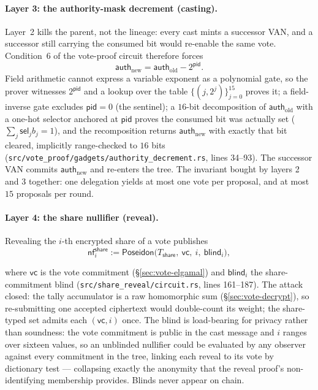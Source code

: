 \documentclass[11pt,a4paper]{article}
\theoremstyle{definition}
\newcommand{\nfsym}{\mathsf{nf}}
\begin{document}
\paragraph{Layer 3: the authority-mask decrement (casting).} Layer~2 kills
the parent, not the lineage: every cast mints a successor VAN, and a
successor still carrying the consumed bit would re-enable the same vote.
Condition~6 of the vote-proof circuit therefore forces
\[
\mathsf{auth}_{\mathrm{new}} = \mathsf{auth}_{\mathrm{old}} -
2^{\mathsf{pid}}.
\]
Field arithmetic cannot express a variable exponent as a polynomial gate, so
the prover witnesses $2^{\mathsf{pid}}$ and a lookup over the table
$\{(j, 2^{j})\}_{j=0}^{15}$ proves it; a field-inverse gate excludes
$\mathsf{pid} = 0$ (the sentinel); a $16$-bit decomposition of
$\mathsf{auth}_{\mathrm{old}}$ with a one-hot selector anchored at
$\mathsf{pid}$ proves the consumed bit was actually set ($\sum_j
\mathsf{sel}_j b_j = 1$), and the recomposition returns
$\mathsf{auth}_{\mathrm{new}}$ with exactly that bit cleared, implicitly
range-checked to $16$ bits
(\texttt{src/vote\_proof/gadgets/authority\_decrement.rs}, lines 34--93).
The successor VAN commits $\mathsf{auth}_{\mathrm{new}}$ and re-enters the
tree. The invariant bought by layers 2 and 3 together: one delegation yields
at most one vote per proposal, and at most $15$ proposals per round.

\paragraph{Layer 4: the share nullifier (reveal).} Revealing the $i$-th
encrypted share of a vote publishes
\[
\nfsym^{\mathsf{share}}_{i} := \mathsf{Poseidon}\bigl(T_{\mathsf{share}},\
\mathsf{vc},\ i,\ \mathsf{blind}_i\bigr),
\]
\begin{sloppypar}
where $\mathsf{vc}$ is the vote commitment (\S\ref{sec:vote-elgamal}) and
$\mathsf{blind}_i$ the share-commitment blind
(\texttt{src/share\_reveal/circuit.rs}, lines 161--187). The attack closed:
the tally accumulator is a raw homomorphic sum
(\S\ref{sec:vote-decrypt}), so re-submitting one accepted ciphertext would
double-count its weight; the share-typed set admits each
$(\mathsf{vc}, i)$ once. The blind is load-bearing for privacy rather than
soundness: the vote commitment is public in the cast message and $i$ ranges
over sixteen values, so an unblinded nullifier could be evaluated by any
observer against every commitment in the tree, linking each reveal to its
vote by dictionary test --- collapsing exactly the anonymity that the reveal
proof's non-identifying membership provides. Blinds never appear on chain.
\end{sloppypar}
\end{document}
